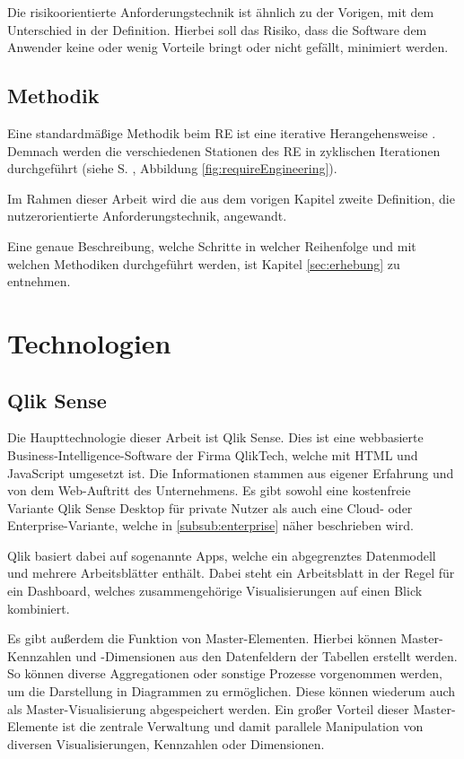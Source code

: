Die risikoorientierte Anforderungstechnik ist ähnlich zu der Vorigen, mit dem Unterschied in der Definition.
Hierbei soll das Risiko, dass die Software dem Anwender keine oder wenig Vorteile bringt oder nicht gefällt, minimiert werden.

\subsection{Methodik}
Eine standardmäßige Methodik beim \gls{RE} ist eine iterative Herangehensweise \cite{Pohl.2011}.
Demnach werden die verschiedenen Stationen des \gls{RE} in zyklischen Iterationen durchgeführt (siehe S. \pageref{fig:requireEngineering}, Abbildung \ref{fig:requireEngineering}).

Im Rahmen dieser Arbeit wird die aus dem vorigen Kapitel zweite Definition, die nutzerorientierte Anforderungstechnik, angewandt. 

Eine genaue Beschreibung, welche Schritte in welcher Reihenfolge und mit welchen Methodiken durchgeführt werden, ist Kapitel \ref{sec:erhebung} zu entnehmen.
 
 
\section{Technologien}
\subsection{Qlik Sense}
\label{sub:qlik}
Die Haupttechnologie dieser Arbeit ist Qlik Sense.
Dies ist eine webbasierte Business-Intelligence-Software der Firma QlikTech, welche mit HTML und JavaScript umgesetzt ist.
Die Informationen stammen aus eigener Erfahrung und von dem Web-Auftritt \cite{QlikTech.2019} des Unternehmens. 
Es gibt sowohl eine kostenfreie Variante Qlik Sense Desktop für private Nutzer als auch eine Cloud- oder Enterprise-Variante, welche in \ref{subsub:enterprise} näher beschrieben wird.

Qlik basiert dabei auf sogenannte \glqq Apps\grqq{}, welche ein abgegrenztes Datenmodell und mehrere Arbeitsblätter enthält.
Dabei steht ein Arbeitsblatt in der Regel für ein \gls{Dashboard}, welches zusammengehörige Visualisierungen auf einen Blick kombiniert.


Es gibt außerdem die Funktion von Master-Elementen.
Hierbei können Master-Kennzahlen und -Dimensionen aus den Datenfeldern der Tabellen erstellt werden. 
So können diverse Aggregationen oder sonstige Prozesse vorgenommen werden, um die Darstellung in Diagrammen zu ermöglichen.
Diese können wiederum auch als Master-Visualisierung abgespeichert werden.
Ein großer Vorteil dieser Master-Elemente ist die zentrale Verwaltung und damit parallele Manipulation von diversen Visualisierungen, Kennzahlen oder Dimensionen.

